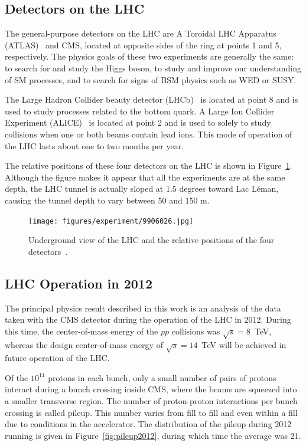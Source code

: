 \subsection{Detectors on the LHC\label{subsec:detectors}}

The general-purpose detectors on the LHC are A Toroidal LHC Apparatus (ATLAS)~\cite{cern-jinst-atlas}
and CMS, located at opposite sides of the ring at points 1 and 5, respectively. The physics
goals of these two experiments are generally the same: to search for and study the Higgs boson,
to study and improve our understanding of SM processes, and to search for signs of BSM physics such as
WED or SUSY.

The Large Hadron Collider beauty detector (LHCb)~\cite{cern-jinst-lhcb}
is located at point 8 and is used
to study processes related to the bottom quark. A Large Ion Collider Experiment
(ALICE)~\cite{cern-jinst-alice} is located
at point 2 and is used to solely to study collisions when one or both beams contain lead ions. This
mode of operation of the LHC lasts about one to two months per year.

The relative positions of these four detectors on the LHC is shown in Figure~\ref{fig:lhc_detectors}.
Although the figure makes it appear that all the experiments are at the same depth, the LHC tunnel is
actually sloped at 1.5 degrees toward Lac L\'{e}man,
causing the tunnel depth to vary between 50 and 150 m.

\begin{figure}[htbp!]
 \begin{center}
    \texttt{[image: figures/experiment/9906026.jpg]}
      \end{center}
\caption{Underground view of the LHC and the relative positions of the four detectors~\cite{Dailler:842399}.}
\label{fig:lhc_detectors}
\end{figure}

\subsection{LHC Operation in 2012}

The principal physics result described in this work is an analysis of the data taken with the
CMS detector during the operation of the LHC in 2012. During this time, the center-of-mass energy
of the $pp$ collisions was $\sqrt{s} = 8$~TeV, whereas the design center-of-mass energy of
$\sqrt{s} = 14$~TeV will be achieved in future operation of the LHC. 

Of the $10^{11}$ protons in each bunch, only a small number of pairs of protons interact during
a bunch crossing inside CMS, where the beams are squeezed into a smaller transverse region. The number
of proton-proton interactions per bunch crossing is called pileup. This number
varies from fill to fill and even within a fill due to conditions in the accelerator. The distribution
of the pileup during 2012 running is given in Figure~\ref{fig:pileup2012}, during which time the
average was 21.


